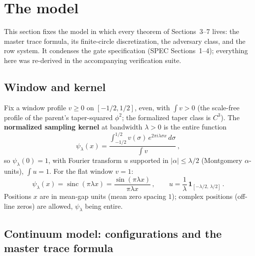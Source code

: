 \documentclass[11pt]{article}
\theoremstyle{plain}
\theoremstyle{definition}
\theoremstyle{remark}
\newcommand{\sinc}{\operatorname{sinc}}
\newcommand{\one}{\mathbf{1}}
\begin{document}
\section{The model}
\label{sec:model}

This section fixes the model in which every theorem of Sections~3--7 lives: the
master trace formula, its finite-circle discretization, the adversary class, and
the row system. It condenses the gate specification (SPEC Sections~1--4);
everything here was re-derived in the accompanying verification suite.

\subsection{Window and kernel}

Fix a window profile $v \ge 0$ on $[-1/2, 1/2]$, even, with $\int v > 0$ (the
scale-free profile of the parent's taper-squared $\phi^2$; the formalized taper
class is $C^3$). The \textbf{normalized sampling kernel} at bandwidth
$\lambda > 0$ is the entire function
\[
  \psi_\lambda(x)
  = \frac{\displaystyle\int_{-1/2}^{1/2} v(\sigma)\,
      e^{2\pi i \lambda \sigma x}\, d\sigma}{\displaystyle\int v}\,,
\]
so $\psi_\lambda(0) = 1$, with Fourier transform $u$ supported in
$|\alpha| \le \lambda/2$ (Montgomery $\alpha$-units), $\int u = 1$. For the flat
window $v = 1$:
\[
  \psi_\lambda(x) = \sinc(\pi \lambda x)
  = \frac{\sin(\pi \lambda x)}{\pi \lambda x}\,,
  \qquad
  u = \frac{1}{\lambda}\,\one_{[-\lambda/2,\, \lambda/2]}\,.
\]
Positions $x$ are in mean-gap units (mean zero spacing $1$); complex positions
(off-line zeros) are allowed, $\psi_\lambda$ being entire.

\subsection{Continuum model: configurations and the master trace formula}
\label{sec:continuum}
\end{document}
